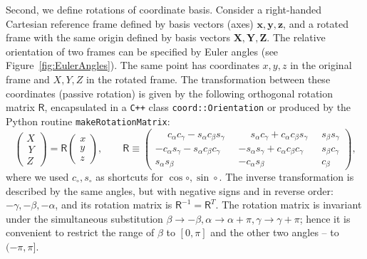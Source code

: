 \documentclass[12pt]{article}
\newcommand{\Cpp}  {\texttt{C++}\xspace}
\newcommand{\bx}{\boldsymbol{x}}
\newcommand{\by}{\boldsymbol{y}}
\newcommand{\bz}{\boldsymbol{z}}
\newcommand{\bX}{\boldsymbol{X}}
\newcommand{\bY}{\boldsymbol{Y}}
\newcommand{\bZ}{\boldsymbol{Z}}
\begin{document}
Second, we define rotations of coordinate basis.
Consider a right-handed Cartesian reference frame defined by basis vectors (axes) $\bx,\by,\bz$, and a rotated frame with the same origin defined by basis vectors $\bX,\bY,\bZ$. The relative orientation of two frames can be specified by Euler angles (see Figure~\ref{fig:EulerAngles}).
The same point has coordinates $x,y,z$ in the original frame and $X,Y,Z$ in the rotated frame.
The transformation between these coordinates (passive rotation) is given by the following orthogonal rotation matrix $\mathsf R$, encapsulated in a \Cpp class \texttt{coord::Orientation} or produced by the Python routine \texttt{makeRotationMatrix}:
\begin{equation}
\left( \begin{array}{c} X \\ \,Y \\ Z \end{array} \right) = \mathsf R 
\left( \begin{array}{c} x \\   y \\ z \end{array} \right) , \qquad
\mathsf R \equiv \left( \begin{array}{ccc}  \phantom{-}
 c_\alpha c_\gamma - s_\alpha c_\beta s_\gamma\;\; & \phantom{-}
 s_\alpha c_\gamma + c_\alpha c_\beta s_\gamma\;\; &
 s_\beta  s_\gamma \\
-c_\alpha s_\gamma - s_\alpha c_\beta c_\gamma\;\; &
-s_\alpha s_\gamma + c_\alpha c_\beta c_\gamma\;\; &
 s_\beta  c_\gamma \\
 s_\alpha s_\beta &
-c_\alpha s_\beta &
 c_\beta 
\end{array} \right) ,
\end{equation}
where we used $c_\circ, s_\circ$ as shortcuts for $\cos\circ, \sin\circ$.
The inverse transformation is described by the same angles, but with negative signs and in reverse order: $-\gamma,-\beta,-\alpha$, and its rotation matrix is $\mathsf R^{-1} = \mathsf R^T$. 
The rotation matrix is invariant under the simultaneous substitution $\beta \to -\beta, \alpha \to \alpha+\pi, \gamma \to \gamma+\pi$; hence it is convenient to restrict the range of $\beta$ to $[0,\pi]$ and the other two angles -- to $(-\pi,\pi]$.\\
\end{document}
